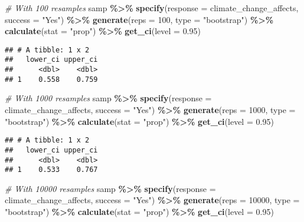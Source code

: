 \documentclass[
]{article}
\newenvironment{Shaded}{\begin{snugshade}}{\end{snugshade}}
\newcommand{\AttributeTok}[1]{\textcolor[rgb]{0.13,0.29,0.53}{#1}}
\newcommand{\CommentTok}[1]{\textcolor[rgb]{0.56,0.35,0.01}{\textit{#1}}}
\newcommand{\DecValTok}[1]{\textcolor[rgb]{0.00,0.00,0.81}{#1}}
\newcommand{\FloatTok}[1]{\textcolor[rgb]{0.00,0.00,0.81}{#1}}
\newcommand{\FunctionTok}[1]{\textcolor[rgb]{0.13,0.29,0.53}{\textbf{#1}}}
\newcommand{\NormalTok}[1]{#1}
\newcommand{\SpecialCharTok}[1]{\textcolor[rgb]{0.81,0.36,0.00}{\textbf{#1}}}
\newcommand{\StringTok}[1]{\textcolor[rgb]{0.31,0.60,0.02}{#1}}
\begin{document}
\begin{Shaded}
\begin{Highlighting}[]
\CommentTok{\# With 100 resamples}
\NormalTok{samp }\SpecialCharTok{\%\textgreater{}\%}
  \FunctionTok{specify}\NormalTok{(}\AttributeTok{response =}\NormalTok{ climate\_change\_affects, }\AttributeTok{success =} \StringTok{"Yes"}\NormalTok{) }\SpecialCharTok{\%\textgreater{}\%}
  \FunctionTok{generate}\NormalTok{(}\AttributeTok{reps =} \DecValTok{100}\NormalTok{, }\AttributeTok{type =} \StringTok{"bootstrap"}\NormalTok{) }\SpecialCharTok{\%\textgreater{}\%}
  \FunctionTok{calculate}\NormalTok{(}\AttributeTok{stat =} \StringTok{"prop"}\NormalTok{) }\SpecialCharTok{\%\textgreater{}\%}
  \FunctionTok{get\_ci}\NormalTok{(}\AttributeTok{level =} \FloatTok{0.95}\NormalTok{)}
\end{Highlighting}
\end{Shaded}

\begin{verbatim}
## # A tibble: 1 x 2
##   lower_ci upper_ci
##      <dbl>    <dbl>
## 1    0.558    0.759
\end{verbatim}

\begin{Shaded}
\begin{Highlighting}[]
\CommentTok{\# With 1000 resamples}
\NormalTok{samp }\SpecialCharTok{\%\textgreater{}\%}
  \FunctionTok{specify}\NormalTok{(}\AttributeTok{response =}\NormalTok{ climate\_change\_affects, }\AttributeTok{success =} \StringTok{"Yes"}\NormalTok{) }\SpecialCharTok{\%\textgreater{}\%}
  \FunctionTok{generate}\NormalTok{(}\AttributeTok{reps =} \DecValTok{1000}\NormalTok{, }\AttributeTok{type =} \StringTok{"bootstrap"}\NormalTok{) }\SpecialCharTok{\%\textgreater{}\%}
  \FunctionTok{calculate}\NormalTok{(}\AttributeTok{stat =} \StringTok{"prop"}\NormalTok{) }\SpecialCharTok{\%\textgreater{}\%}
  \FunctionTok{get\_ci}\NormalTok{(}\AttributeTok{level =} \FloatTok{0.95}\NormalTok{)}
\end{Highlighting}
\end{Shaded}

\begin{verbatim}
## # A tibble: 1 x 2
##   lower_ci upper_ci
##      <dbl>    <dbl>
## 1    0.533    0.767
\end{verbatim}

\begin{Shaded}
\begin{Highlighting}[]
\CommentTok{\# With 10000 resamples}
\NormalTok{samp }\SpecialCharTok{\%\textgreater{}\%}
  \FunctionTok{specify}\NormalTok{(}\AttributeTok{response =}\NormalTok{ climate\_change\_affects, }\AttributeTok{success =} \StringTok{"Yes"}\NormalTok{) }\SpecialCharTok{\%\textgreater{}\%}
  \FunctionTok{generate}\NormalTok{(}\AttributeTok{reps =} \DecValTok{10000}\NormalTok{, }\AttributeTok{type =} \StringTok{"bootstrap"}\NormalTok{) }\SpecialCharTok{\%\textgreater{}\%}
  \FunctionTok{calculate}\NormalTok{(}\AttributeTok{stat =} \StringTok{"prop"}\NormalTok{) }\SpecialCharTok{\%\textgreater{}\%}
  \FunctionTok{get\_ci}\NormalTok{(}\AttributeTok{level =} \FloatTok{0.95}\NormalTok{)}
\end{Highlighting}
\end{Shaded}
\end{document}
